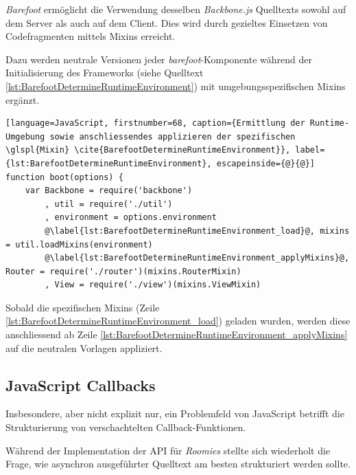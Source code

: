 \emph{Barefoot} \cite{Barefoot} ermöglicht die Verwendung desselben \emph{Backbone.js} Quelltexts sowohl auf dem Server als auch auf dem Client. Dies wird durch gezieltes Einsetzen von Codefragmenten mittels \gls{Mixin}s erreicht.

Dazu werden neutrale Versionen jeder \emph{barefoot}-Komponente während der Initialisierung des Frameworks (siehe Quelltext \ref{lst:BarefootDetermineRuntimeEnvironment}) mit umgebungsspezifischen Mixins ergänzt.

\begin{lstlisting}[language=JavaScript, firstnumber=68, caption={Ermittlung der Runtime-Umgebung sowie anschliessendes applizieren der spezifischen \glspl{Mixin} \cite{BarefootDetermineRuntimeEnvironment}}, label={lst:BarefootDetermineRuntimeEnvironment}, escapeinside={@}{@}]
function boot(options) {
	var Backbone = require('backbone')
		, util = require('./util')
		, environment = options.environment
		@\label{lst:BarefootDetermineRuntimeEnvironment_load}@, mixins = util.loadMixins(environment)
		@\label{lst:BarefootDetermineRuntimeEnvironment_applyMixins}@, Router = require('./router')(mixins.RouterMixin)
		, View = require('./view')(mixins.ViewMixin)
\end{lstlisting}

Sobald die spezifischen \gls{Mixin}s (Zeile \ref{lst:BarefootDetermineRuntimeEnvironment_load}) geladen wurden, werden diese anschliessend ab Zeile \ref{lst:BarefootDetermineRuntimeEnvironment_applyMixins} auf die neutralen Vorlagen appliziert.



\subsection{JavaScript Callbacks}
Insbesondere, aber nicht explizit nur, ein Problemfeld von JavaScript betrifft die Strukturierung von verschachtelten Callback-Funktionen.

Während der Implementation der API für \emph{Roomies} stellte sich wiederholt die Frage, wie asynchron ausgeführter Quelltext am besten strukturiert werden sollte.

